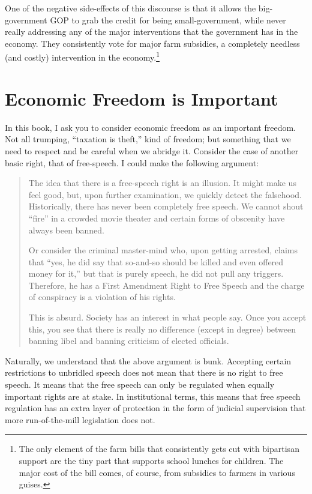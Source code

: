 One of the negative side-effects of this discourse is that it allows the
big-government GOP to grab the credit for being small-government, while never
really addressing any of the major interventions that the government has in the
economy. They consistently vote for major farm subsidies, a completely needless
(and costly) intervention in the economy.\footnote{The only element of the farm
bills that consistently gets cut with bipartisan support are the tiny part that
supports school lunches for children. The major cost of the bill comes, of
course, from subsidies to farmers in various guises.}


\section{Economic Freedom is Important}

In this book, I ask you to consider economic freedom as an important freedom.
Not all trumping, ``taxation is theft,'' kind of freedom; but something that we
need to respect and be careful when we abridge it. Consider the case of another
basic right, that of free-speech. I could make the following argument:

\begin{quote}
The idea that there is a free-speech right is an illusion. It might make us
feel good, but, upon further examination, we quickly detect the falsehood.
Historically, there has never been completely free speech. We cannot shout
``fire'' in a crowded movie theater and certain forms of obscenity have always
been banned.

Or consider the criminal master-mind who, upon getting arrested, claims that
``yes, he did say that so-and-so should be killed and even offered money for
it,'' but that is purely speech, he did not pull any triggers. Therefore, he
has a First Amendment Right to Free Speech and the charge of conspiracy is a
violation of his rights.

This is absurd. Society has an interest in what people say. Once you accept
this, you see that there is really no difference (except in degree) between
banning libel and banning criticism of elected officials.
\end{quote}

Naturally, we understand that the above argument is bunk. Accepting certain
restrictions to unbridled speech does not mean that there is no right to free
speech. It means that the free speech can only be regulated when equally
important rights are at stake. In institutional terms, this means that free
speech regulation has an extra layer of protection in the form of judicial
supervision that more run-of-the-mill legislation does not.

